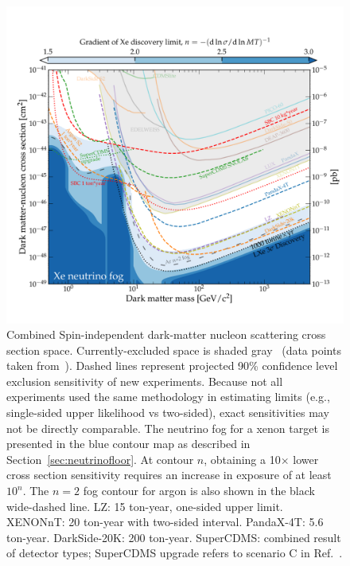 \begin{figure}
    \centering
    \includegraphics[width=\textwidth]{figures/CombinedLimitPlot_SI.pdf}
    \caption{Combined Spin-independent dark-matter nucleon scattering cross section space. Currently-excluded space is shaded gray~\cite{pandax-iicollaboration2017, picocollaboration2017, darksidecollaboration2018a, cresstcollaboration2019,hehn2016a,darksidecollaboration2018,luxcollaboration2017,xenoncollaboration2021,deapcollaboration2019,supercdmscollaboration2019a} (data points taken from~\cite{OHare:2021utq}). Dashed lines represent projected 90\% confidence level exclusion sensitivity of new experiments. Because not all experiments used the same methodology in estimating limits (e.g., single-sided upper likelihood vs two-sided), exact sensitivities may not be directly comparable. The neutrino fog for a xenon target is presented in the blue contour map as described in Section~\ref{sec:neutrinofloor}. At contour $n$, obtaining a 10$\times$ lower cross section sensitivity requires an increase in exposure of at least $10^n$. The $n=2$ fog contour for argon is also shown in the black wide-dashed line. LZ: 15 ton-year, one-sided upper limit. XENONnT: 20 ton-year with two-sided interval. PandaX-4T: 5.6 ton-year. DarkSide-20K: 200 ton-year. SuperCDMS: combined result of detector types; SuperCDMS upgrade refers to scenario C in Ref.~\cite{SuperCDMS_SNOWMASS22}. 
    \label{fig:limitplot_SI}}
\end{figure}
